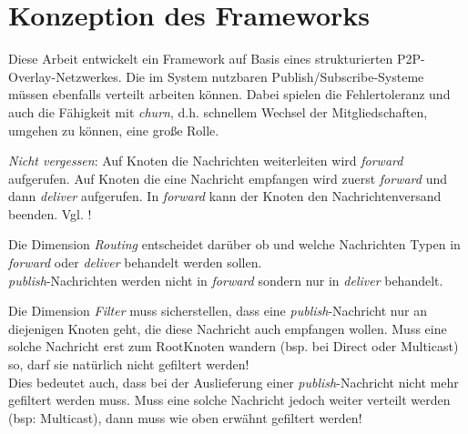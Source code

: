 \chapter{Konzeption des Frameworks}
\label{chap:konzeption_pubsub}
Diese Arbeit entwickelt ein Framework auf Basis eines strukturierten P2P-Overlay-Netzwerkes. Die im System nutzbaren Publish/Subscribe-Systeme müssen ebenfalls verteilt arbeiten können. Dabei spielen die Fehlertoleranz und auch die Fähigkeit mit \emph{churn}, d.h. schnellem Wechsel der Mitgliedschaften, umgehen zu können, eine große Rolle.

\emph{Nicht vergessen}: Auf Knoten die Nachrichten weiterleiten wird \emph{forward} aufgerufen. Auf Knoten die eine Nachricht empfangen wird zuerst \emph{forward} und dann \emph{deliver} aufgerufen. In \emph{forward} kann der Knoten den Nachrichtenversand beenden. Vgl. !

Die Dimension \emph{Routing} entscheidet darüber ob und welche Nachrichten Typen in \emph{forward} oder \emph{deliver} behandelt werden sollen.\\
\emph{publish}-Nachrichten werden nicht in \emph{forward} sondern nur in \emph{deliver} behandelt.

Die Dimension \emph{Filter} muss sicherstellen, dass eine \emph{publish}-Nachricht nur an diejenigen Knoten geht, die diese Nachricht auch empfangen wollen. Muss eine solche Nachricht erst zum RootKnoten wandern (bsp. bei Direct oder Multicast) so, darf sie natürlich nicht gefiltert werden!\\
Dies bedeutet auch, dass bei der Auslieferung einer \emph{publish}-Nachricht nicht mehr gefiltert werden muss. Muss eine solche Nachricht jedoch weiter verteilt werden (bsp: Multicast), dann muss wie oben erwähnt gefiltert werden!


\cite{Fischer2010a, Fischer2010Event}
\begin{table}[!h]
\label{tab:konzeption_pubsub:verbindungsmatrix}
\caption{Verbindungsmatrix}
\end{table}






\cite{BeFiMu2006PubSubQoS}


\cite{KostasKatrinis2005}
